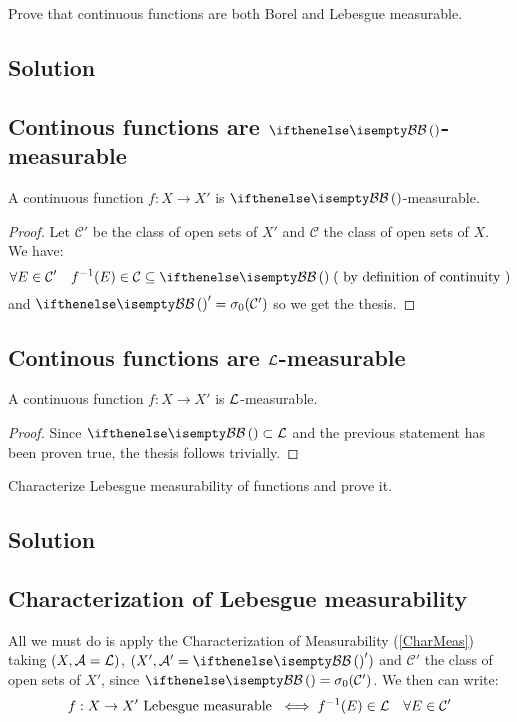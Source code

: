 
\question

Prove that continuous functions are both Borel and Lebesgue measurable.

\subsection*{Solution}

\subsection{Continous functions are \texorpdfstring{$\B$}{Borel}-measurable}
A continuous function $f:X\to X'$ is $\B$-measurable.

\begin{proof}
    Let $\mathcal{C}'$ be the class of open sets of $X'$ and $\mathcal{C}$ the class of open sets of $X$. We have:
    \[
        \forall E \in \mathcal{C}' \quad f^{-1}(E)\in\mathcal{C} \subseteq \B \; (\text{ by definition of continuity })
    \]
    and $\B'=\sigma_0(\mathcal{C}')$ so we get the thesis.
\end{proof}

\subsection{Continous functions are \texorpdfstring{$\mathcal{L}$}{Lebesgue}-measurable}
A continuous function $f:X\to X'$ is $\mathcal{L}$-measurable.

\begin{proof}
    Since $\B \subset \Leb$ and the previous statement has been proven true, the thesis follows trivially.
\end{proof}


\question

Characterize Lebesgue measurability of functions and prove it.

\subsection*{Solution}

\subsection{Characterization of Lebesgue measurability}
All we must do is apply the Characterization of Measurability (\ref{CharMeas}) taking $(X,\mathcal{A}=\mathcal{L})$, $(X', \A'=\B')$ and $\mathcal{C}'$ the class of open sets of $X'$, since $\B=\sigma_0(\mathcal{C}')$. We then can write:
\[
    f:X\to X' \text{ Lebesgue measurable } \iff f^{-1}(E)\in\mathcal{L} \quad \forall E\in\mathcal{C}'
\]

